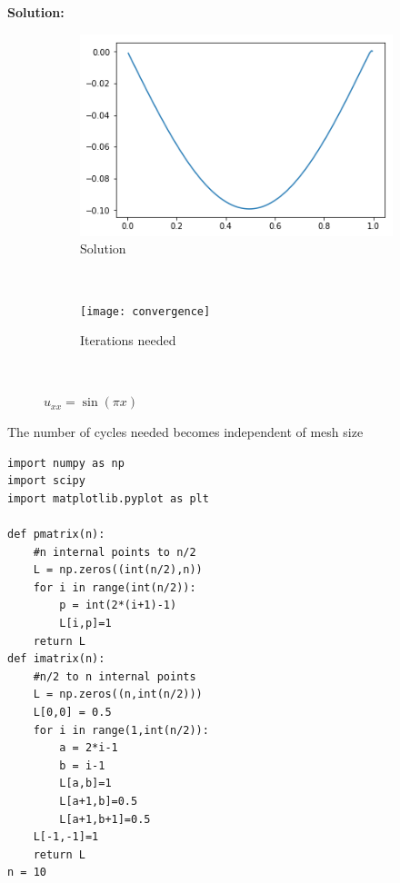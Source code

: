 \documentclass[letterpaper,12pt]{article}
\begin{document}
\begin{enumerate}
{\bf Solution:}



\begin{figure}[H]
    \centering
    \begin{subfigure}[b]{0.45\textwidth}
        \includegraphics[width=\textwidth]{solution}
        \caption{Solution}
        \label{fig:gull}
    \end{subfigure}
    ~ %
    \begin{subfigure}[b]{0.45\textwidth}
        \texttt{[image: convergence]}
        \caption{Iterations needed}
        \label{fig:tiger}
    \end{subfigure}
    ~ %

    \caption{$u_{xx} = \sin(\pi x) $}\label{fig:animals}
\end{figure}

The number of cycles needed becomes independent of mesh size
\begin{lstlisting}[style=myPythonstyle]
import numpy as np
import scipy 
import matplotlib.pyplot as plt

def pmatrix(n):
    #n internal points to n/2
    L = np.zeros((int(n/2),n))
    for i in range(int(n/2)):
        p = int(2*(i+1)-1)
        L[i,p]=1
    return L
def imatrix(n):
    #n/2 to n internal points
    L = np.zeros((n,int(n/2)))
    L[0,0] = 0.5
    for i in range(1,int(n/2)):
        a = 2*i-1
        b = i-1
        L[a,b]=1
        L[a+1,b]=0.5
        L[a+1,b+1]=0.5
    L[-1,-1]=1
    return L
n = 10


\end{lstlisting}
\end{enumerate}
\end{document}
